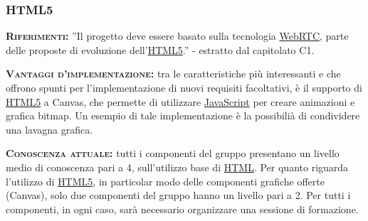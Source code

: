 \subsubsection{HTML5}
\begin{description}
	\item{\scshape\bfseries Riferimenti:} ''Il progetto deve essere basato sulla tecnologia \underline{WebRTC}, parte delle proposte di evoluzione dell'\underline{HTML5}.'' - estratto dal capitolato C1.
	
	\item{\scshape\bfseries Vantaggi d'implementazione:} tra le caratteristiche più interessanti e che offrono spunti per l'implementazione di nuovi requisiti facoltativi, è il supporto di \underline{HTML5} a Canvas, che permette di utilizzare \underline{JavaScript} per creare animazioni e grafica bitmap. Un esempio di tale implementazione è la possibilià di condividere una lavagna grafica.
	
	\item{\scshape\bfseries Conoscenza attuale:} tutti i componenti del gruppo presentano un livello medio di conoscenza pari a 4, sull'utilizzo base di \underline{HTML}. Per quanto riguarda l'utilizzo di \underline{HTML5}, in particolar modo delle componenti grafiche offerte (Canvas), solo due componenti del gruppo hanno un livello pari a 2. Per tutti i componenti, in ogni caso, sarà necessario organizzare una sessione di formazione.
\end{description}

